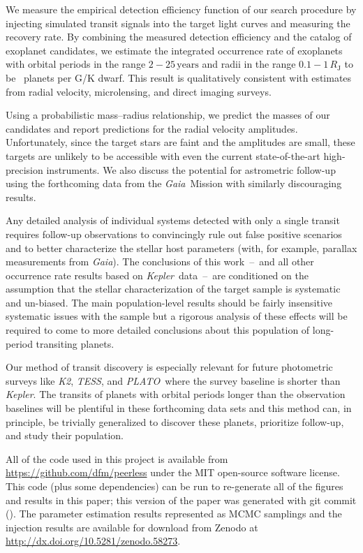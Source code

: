 \documentclass[manuscript, letterpaper]{aastex6}
\newcommand{\project}[1]{\textsl{#1}}
\newcommand{\kepler}{\project{Kepler}}
\newcommand{\KT}{\project{K2}}
\newcommand{\tess}{\project{TESS}}
\newcommand{\plato}{\project{PLATO}}
\newcommand{\gaia}{\project{Gaia}}
\newcommand{\unit}[1]{{\ensuremath{\,\mathrm{#1}}}}
\newcommand{\paper}{paper}
\newcommand{\datareleaseurl}{\url{http://dx.doi.org/10.5281/zenodo.58273}}
\begin{document}
We measure the empirical detection efficiency function of our search procedure
by injecting simulated transit signals into the target light curves and
measuring the recovery rate.
By combining the measured detection efficiency and the catalog of exoplanet
candidates, we estimate the integrated occurrence rate of exoplanets with
orbital periods in the range $2-25\unit{years}$ and radii in the range
$0.1-1\,R_\mathrm{J}$ to be \intocc\ planets per G/K dwarf.
This result is qualitatively consistent with estimates from radial velocity,
microlensing, and direct imaging surveys.

Using a probabilistic mass--radius relationship, we predict the masses of our
candidates and report predictions for the radial velocity amplitudes.
Unfortunately, since the target stars are faint and the amplitudes are small,
these targets are unlikely to be accessible with even the current
state-of-the-art high-precision instruments.
We also discuss the potential for astrometric follow-up using the forthcoming
data from the \gaia\ Mission with similarly discouraging results.

Any detailed analysis of individual systems detected with only a single
transit requires follow-up observations to convincingly rule out false
positive scenarios and to better characterize the stellar host parameters
(with, for example, parallax measurements from \gaia).
The conclusions of this work~--~and all other occurrence rate results based on
\kepler\ data~--~are conditioned on the assumption that the stellar
characterization of the target sample is systematic and un-biased.
The main population-level results should be fairly insensitive systematic
issues with the sample but a rigorous analysis of these effects will be
required to come to more detailed conclusions about this population of
long-period transiting planets.

Our method of transit discovery is especially relevant for future photometric
surveys like \KT, \tess, and \plato\ where the survey baseline is shorter than
\kepler.
The transits of planets with orbital periods longer than the observation
baselines will be plentiful in these forthcoming data sets and this method
can, in principle, be trivially generalized to discover these planets,
prioritize follow-up, and study their population.

\vspace{1.5em}
All of the code used in this project is available from
\url{https://github.com/dfm/peerless} under the MIT open-source software
license.
This code (plus some dependencies) can be run to re-generate all of the
figures and results in this \paper; this version of the paper was generated
with git commit \texttt{\githash} (\gitdate).
The parameter estimation results represented as MCMC samplings and the
injection results are available for download from Zenodo at \datareleaseurl.
\end{document}
